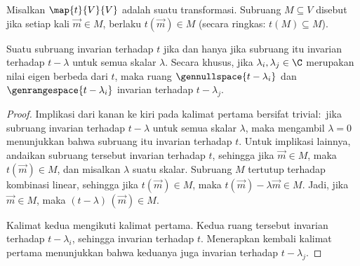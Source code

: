 \begin{definition} \label{def:invariant}
Misalkan \( \map{t}{V}{V} \) adalah suatu transformasi.
Subruang \( M\subseteq V \) disebut %
jika setiap kali \( \vec{m}\in M \), berlaku \( t(\vec{m})\in M \)
(secara ringkas: \( t(M)\subseteq M \)).
\end{definition}

\begin{lemma} \label{le:tInvIfftMinLambdaInv}
Suatu subruang invarian terhadap \( t \) jika dan hanya jika
subruang itu invarian terhadap \( t-\lambda \) untuk semua skalar \( \lambda \).
Secara khusus,
jika \( \lambda_i,\lambda_j\in\C \) merupakan nilai eigen berbeda dari
\( t \), maka
ruang \( \gennullspace{t-\lambda_i} \)
dan \( \genrangespace{t-\lambda_i} \)
invarian terhadap \( t-\lambda_j \).
\end{lemma}

\begin{proof}
Implikasi dari kanan ke kiri pada kalimat pertama bersifat trivial:~jika
subruang invarian terhadap $t-\lambda$ untuk
semua skalar $\lambda$, maka mengambil $\lambda=0$
menunjukkan bahwa subruang itu invarian terhadap $t$.
Untuk implikasi lainnya, andaikan subruang tersebut invarian terhadap $t$,
sehingga jika $\vec{m}\in M$, maka $t(\vec{m})\in M$, dan misalkan $\lambda$
suatu skalar.
Subruang $M$ tertutup terhadap kombinasi linear, sehingga jika
$t(\vec{m})\in M$, maka $t(\vec{m})-\lambda\vec{m}\in M$.
Jadi, jika $\vec{m}\in M$, maka $(t-\lambda)\,(\vec{m})\in M$.

Kalimat kedua mengikuti kalimat pertama.
Kedua ruang tersebut invarian terhadap $t-\lambda_i$, sehingga invarian terhadap \( t \).
Menerapkan kembali kalimat pertama menunjukkan bahwa
keduanya juga invarian terhadap \( t-\lambda_j \).
\end{proof}

